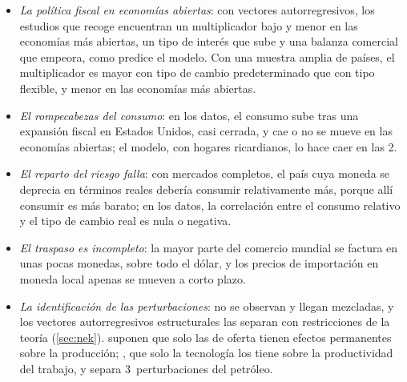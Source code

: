 \documentclass[11pt]{article}
\begin{document}
\begin{itemize}
\item \emph{La política fiscal en economías abiertas}: con vectores autorregresivos, los estudios que recoge \textcite{Furlanetto2006Fiscal} encuentran un multiplicador bajo y menor en las economías más abiertas, un tipo de interés que sube y una balanza comercial que empeora, como predice el modelo. Con una muestra amplia de países, el multiplicador es mayor con tipo de cambio predeterminado que con tipo flexible, y menor en las economías más abiertas\nocite{IlzetzkiMendozaVegh2013}.
\item \emph{El rompecabezas del consumo}: en los datos, el consumo sube tras una expansión fiscal en Estados Unidos, casi cerrada, y cae o no se mueve en las economías abiertas; el modelo, con hogares ricardianos, lo hace caer en las 2\nocite{Furlanetto2006Fiscal}.
\item \emph{El reparto del riesgo falla}: con mercados completos, el país cuya moneda se deprecia en términos reales debería consumir relativamente más, porque allí consumir es más barato; en los datos, la correlación entre el consumo relativo y el tipo de cambio real es nula o negativa\nocite{BackusSmith1993Consumption}.
\item \emph{El traspaso es incompleto}: la mayor parte del comercio mundial se factura en unas pocas monedas, sobre todo el dólar, y los precios de importación en moneda local apenas se mueven a corto plazo\nocite{Gopinath2020DCP}.
\item \emph{La identificación de las perturbaciones}: no se observan y llegan mezcladas, y los vectores autorregresivos estructurales las separan con restricciones de la teoría (\ref{sec:nek}). \textcite{BlanchardQuah1989} suponen que solo las de oferta tienen efectos permanentes sobre la producción; \textcite{Gali1999Technology}, que solo la tecnología los tiene sobre la productividad del trabajo, y \textcite{Kilian2009NotAll} separa 3~perturbaciones del petróleo.
\end{itemize}
\end{document}
